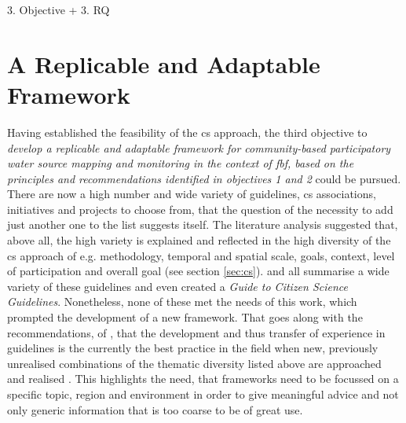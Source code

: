 3. Objective + 3. RQ
\section{A Replicable and Adaptable Framework}

Having established the feasibility of the \acrshort{cs} approach, the third objective to \textit{develop a replicable and adaptable framework for community-based participatory water source mapping and monitoring in the context of \acrlong{fbf}, based on the principles and recommendations identified in objectives 1 and 2} could be pursued. There are now a high number and wide variety of guidelines, \acrshort{cs} associations, initiatives and projects to choose from, that the question of the necessity to add just another one to the list suggests itself. The literature analysis suggested that, above all, the high variety is explained and reflected in the high diversity of the \acrshort{cs} approach of e.g. methodology, temporal and spatial scale, goals, context, level of participation and overall goal (see section \ref{sec:cs}). \autocite{fraislCitizenScienceEnvironmental2022, westonCommunityBasedWaterMonitoring2015} and \autocite{zhengCrowdsourcingMethodsData2018} all summarise a wide variety of these guidelines and \autocite{garciaFindingWhatYou2021} even created a \textit{Guide to Citizen Science Guidelines}. Nonetheless, none of these met the needs of this work, which prompted the development of a new framework. That goes along with the recommendations, of \autocite{garciaFindingWhatYou2021}, that the development and thus transfer of experience in guidelines is the currently the best practice in the field when new, previously unrealised combinations of the thematic diversity listed above are approached and realised \autocite{garciaFindingWhatYou2021}. This highlights the need, that frameworks need to be focussed on a specific topic, region and environment in order to give meaningful advice and not only generic information that is too coarse to be of great use.\newline
